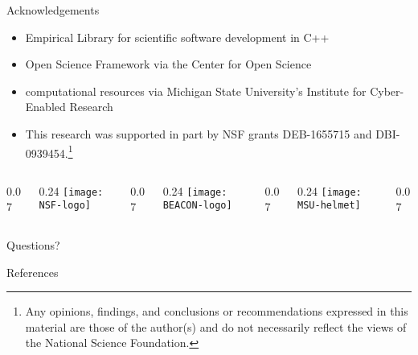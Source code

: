 \begin{frame}{Acknowledgements}
\begin{itemize}
\item Empirical Library for scientific software development in C++
\item Open Science Framework via the Center for Open Science
\item computational resources via Michigan State University's Institute for Cyber-Enabled Research
\item This research was supported in part by NSF grants DEB-1655715 and DBI-0939454.\footnote[1]{Any opinions, findings, and conclusions or recommendations expressed in this material are those of the author(s) and do not necessarily reflect the views of the National Science Foundation.}
\end{itemize}

\newcommand{\innerspacer}{0.07\textwidth}
\newcommand{\content}{0.24\textwidth}
\newcommand{\outerspacer}{0.07\textwidth}

\begin{center}
 \begin{columns}
	\begin{column}{\outerspacer}~\end{column}
	 \begin{column}{\content}
		\texttt{[image: NSF-logo]}
 	\end{column}
  \begin{column}{\innerspacer}~\end{column}
	 \begin{column}{\content}
		\texttt{[image: BEACON-logo]}
 	\end{column}
  \begin{column}{\innerspacer}~\end{column}
 	\begin{column}{\content}
   \texttt{[image: MSU-helmet]}
 	\end{column}
 	\begin{column}{\outerspacer}~\end{column}
 \end{columns}
\end{center}

\end{frame}


\begin{frame}[standout]
  Questions?
\end{frame}

\begin{frame}[allowframebreaks]{References}

  
  \nocite{*} %
  
\end{frame}
